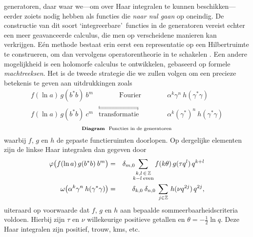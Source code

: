 \documentclass{book}
\begin{document}
generatoren, daar waar we---om over Haar integralen te kunnen beschikken---eerder zoiets
nodig hebben als functies die {\em naar nul gaan\/} op oneindig.
De constructie van dit soort \lq integreerbare\rq\ functies in de generatoren
vereist echter een meer geavanceerde calculus, die men op
verscheidene manieren kan verkrijgen. E\'en methode bestaat erin eerst een representatie
op een Hilbertruimte te construeren, om dan vervolgens operatorentheorie in te schakelen
\cite{Fons:spectral_conditions,FonsWor:QE2,Wor:QE2,Wor:Affiliated,Wor:operatoreq}\@.
Een andere mogelijkheid is een holomorfe calculus te ontwikkelen, gebaseerd op
formele {\em machtreeksen}\@.
Het is de tweede strategie die we zullen volgen om een precieze betekenis te
geven aan uitdrukkingen zoals
$$ \begin{array}{lcr}
    f(\ln a)\, g(b^* b)\: b^m  &  \hspace{3em} \mbox{Fourier} \hspace{3em}&
       \alpha^k  \gamma^n \:  h(\gamma^*\gamma) \\
    f(\ln a)\, g(b^* b)\: c^m  &
      \stackrel{\displaystyle \leftrightarrows}{\mbox{transformatie}} &
           \alpha^k  (\gamma^*)^n  \: h(\gamma^*\gamma)
   \end{array}$$
\begin{equation}\label{eq:diagram:Fourier}
\mbox{\scriptsize {\bf Diagram}\hspace{3pt}\ Functies in de generatoren}
\end{equation}
waarbij $f$, $g$ en $h$ de gepaste functieruimten doorlopen.
Op dergelijke elementen zijn de linkse Haar integralen dan gegeven door
\begin{eqnarray*}
  \varphi \!\left(  f(\ln a)\, g(b^* b)\: b^m  \vertM\right)
     &=& \delta_{m,0} \!\!\! \sum_{\stackrel{\scriptstyle k,l\,\in\, \ZZ}{\scriptstyle k-l\: {\rm even}}}
            f(k \theta) \, g(\tau q^l) \, q^{k+l}  \\
  \omega \!\left(\alpha^k \gamma^n \:  h(\gamma^*\gamma)\vertM\right)
           &=& \delta_{k,0}\:\delta_{n,0} \: \sum_{j\in\ZZ} \, h(\nu q^{2j})\, q^{2j},
\end{eqnarray*}
uiteraard op voorwaarde dat $f$, $g$ en $h$ aan bepaalde sommeerbaarheidscriteria voldoen.
Hierbij zijn $\tau$ en $\nu$ willekeurige positieve getallen en
\mbox{$\theta = -\frac{1}{2} \ln q$}\@.
Deze Haar integralen zijn positief, trouw, {\sc kms}, etc.
\end{document}
